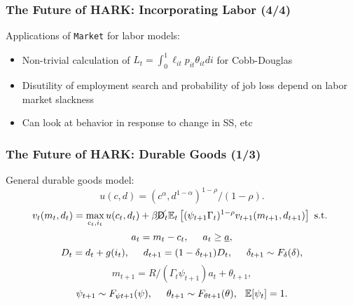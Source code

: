 \documentclass[11ptt]{beamer}
\newcommand{\E}{\mathbb{E}}
\newcommand{\bi}{\begin{itemize}}
\newcommand{\ei}{\end{itemize}}
\newcommand{\Die}{\mathsf{D}}
\newcommand{\Live}{\cancel{\Die}}
\begin{document}
\begin{frame}
\frametitle{The Future of HARK: Incorporating Labor (4/4)}
Applications of \texttt{Market} for labor models:
\bi
\item Non-trivial calculation of $L_t = \int_0^1 \ell_{it} p_{it} \theta_{it} di$ for Cobb-Douglas

\item Disutility of employment search and probability of job loss depend on labor market slackness

\item Can look at behavior in response to change in SS, etc
\ei

\hyperlink{DiscussionTopics}{}
\end{frame}


\begin{frame}\label{DurableGoods}
\frametitle{The Future of HARK: Durable Goods (1/3)}

General durable goods model:
\begin{equation*}
u(c,d) = (c^\alpha,d^{1-\alpha})^{1-\rho}/(1-\rho).
\end{equation*}
\begin{equation*}
v_t(m_t,d_t) = \max_{c_t,i_t} u(c_t,d_t) + \beta \Live_t \E_t \left[(\psi_{t+1} \Gamma_t)^{1-\rho} v_{t+1}(m_{t+1},d_{t+1}) \right] \text{ s.t. }
\end{equation*}
\begin{equation*}
a_t = m_t - c_t, \hspace{0.5cm} a_t \geq \underline{a},
\end{equation*}
\begin{equation*}
D_t = d_t + g(i_t), \hspace{0.5cm} d_{t+1} = (1-\delta_{t+1})D_t, \hspace{0.5cm} \delta_{t+1} \sim F_{\delta}(\delta),
\end{equation*}
\begin{equation*}
m_{t+1} = R/(\Gamma_t \psi_{t+1}) a_t + \theta_{t+1}, 
\end{equation*}
\begin{equation*}
\psi_{t+1} \sim F_{\psi t+1}(\psi), \hspace{0.5cm} \theta_{t+1} \sim F_{\theta t+1}(\theta), \hspace{0.25cm} \E[\psi_t] = 1.
\end{equation*}
\end{frame}
\end{document}
